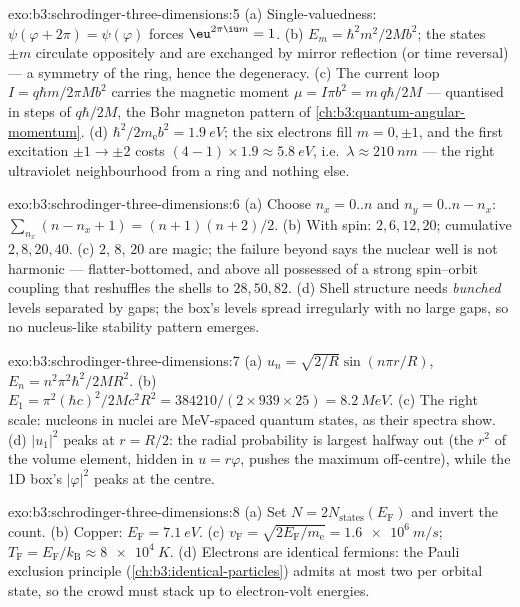 \begin{solution}{exo:b3:schrodinger-three-dimensions:5}
(a) Single-valuedness: $\psi(\varphi + 2\pi) = \psi(\varphi)$ forces
$\eu^{2\pi\iu m} = 1$. (b) $E_m = \hbar^2m^2/2Mb^2$; the states $\pm
m$ circulate oppositely and are exchanged by mirror reflection (or
time reversal) --- a symmetry of the ring, hence the degeneracy. (c)
The current loop $I = q\hbar m/2\pi Mb^2$ carries the magnetic moment
$\mu = I\pi b^2 = m\,q\hbar/2M$ --- quantised in steps of $q\hbar/2M$,
the Bohr magneton pattern of \cref{ch:b3:quantum-angular-momentum}.
(d) $\hbar^2/2m_{\text{e}}b^2 = \qty{1.9}{eV}$; the six electrons
fill $m = 0, \pm1$, and the first excitation $\pm1 \to \pm2$ costs
$(4-1) \times 1.9 \approx \qty{5.8}{eV}$, i.e.\ $\lambda \approx
\qty{210}{nm}$ --- the right ultraviolet neighbourhood from a ring
and nothing else.
\end{solution}

\begin{solution}{exo:b3:schrodinger-three-dimensions:6}
(a) Choose $n_x = 0..n$ and $n_y = 0..n - n_x$: $\sum_{n_x}(n - n_x
+ 1) = (n+1)(n+2)/2$. (b) With spin: $2, 6, 12, 20$; cumulative $2,
8, 20, 40$. (c) $2$, $8$, $20$ are magic; the failure beyond says
the nuclear well is not harmonic --- flatter-bottomed, and above all
possessed of a strong spin--orbit coupling that reshuffles the
shells to $28, 50, 82$. (d) Shell structure needs \emph{bunched}
levels separated by gaps; the box's levels spread irregularly with
no large gaps, so no nucleus-like stability pattern emerges.
\end{solution}

\begin{solution}{exo:b3:schrodinger-three-dimensions:7}
(a) $u_n = \sqrt{2/R}\sin(n\pi r/R)$, $E_n = n^2\pi^2\hbar^2/2MR^2$.
(b) $E_1 = \pi^2(\hbar c)^2/2Mc^2R^2 = 384210/(2 \times 939 \times
25) = \qty{8.2}{MeV}$. (c) The right scale: nucleons in nuclei are
MeV-spaced quantum states, as their spectra show. (d) $|u_1|^2$
peaks at $r = R/2$: the radial probability is largest halfway out
(the $r^2$ of the volume element, hidden in $u = r\varphi$, pushes
the maximum off-centre), while the 1D box's $|\varphi|^2$ peaks at
the centre.
\end{solution}

\begin{solution}{exo:b3:schrodinger-three-dimensions:8}
(a) Set $N = 2N_{\text{states}}(E_{\text{F}})$ and invert the count.
(b) Copper: $E_{\text{F}} = \qty{7.1}{eV}$. (c) $v_{\text{F}} =
\sqrt{2E_{\text{F}}/m_{\text{e}}} = \qty{1.6e6}{m/s}$;
$T_{\text{F}} = E_{\text{F}}/k_{\text{B}} \approx \qty{8e4}{K}$. (d)
Electrons are identical fermions: the Pauli exclusion principle
(\cref{ch:b3:identical-particles}) admits at most two per orbital
state, so the crowd must stack up to electron-volt energies.
\end{solution}

